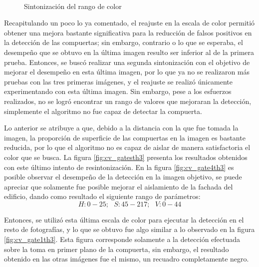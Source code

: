 \begin{figure}[ht]
    \centering
    \hfill
    \\
    \hfill
    \hfill

    \caption{Sintonización del rango de color}
    \label{fig:cv_gatesth2}
\end{figure}

Recapitulando un poco lo ya comentado, el reajuste en la escala de color permitió obtener una mejora bastante significativa para la reducción de falsos positivos en la detección de las compuertas; sin embargo, contrario o lo que se esperaba, el desempeño que se obtuvo en la última imagen resulto ser inferior al de la primera prueba. Entonces, se buscó realizar una segunda sintonización con el objetivo de mejorar el desempeño en esta última imagen, por lo que ya no se realizaron más pruebas con las tres primeras imágenes, y el reajuste se realizó únicamente experimentando con esta última imagen. Sin embargo, pese a los esfuerzos realizados, no se logró encontrar un rango de valores que mejoraran la detección, simplemente el algoritmo no fue capaz de detectar la compuerta.

Lo anterior se atribuye a que, debido a la distancia con la que fue tomada la imagen, la proporción de superficie de las compuertas en la imagen es bastante reducida, por lo que el algoritmo no es capaz de aislar de manera satisfactoria el color que se busca. La figura \ref{fig:cv_gatesth3} presenta los resultados obtenidos con este último intento de resintonización. En la figura \ref{fig:cv_gate4th3} es posible observar el desempeño de la detección en la imagen objetivo, se puede apreciar que solamente fue posible mejorar el aislamiento de la fachada del edificio, dando como resultado el siguiente rango de parámetros:\[H:0-25;\text{ } S:45-217;\text{ } V:0-44\]

Entonces, se utilizó esta última escala de color para ejecutar la detección en el resto de fotografías, y lo que se obtuvo fue algo similar a lo observado en la figura \ref{fig:cv_gate1th3}. Esta figura corresponde solamente a la detección efectuada sobre la toma en primer plano de la compuerta, sin embargo, el resultado obtenido en las otras imágenes fue el mismo, un recuadro completamente negro.

